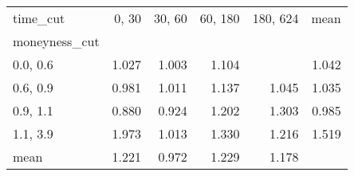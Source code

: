 \begin{tabular}{lrrrrr}
\toprule
time\_cut &  0, 30 &  30, 60 &  60, 180 &  180, 624 &  mean \\
moneyness\_cut &          &           &            &             &       \\
\midrule
0.0, 0.6    &    1.027 &     1.003 &      1.104 &             & 1.042 \\
0.6, 0.9    &    0.981 &     1.011 &      1.137 &       1.045 & 1.035 \\
0.9, 1.1    &    0.880 &     0.924 &      1.202 &       1.303 & 0.985 \\
1.1, 3.9    &    1.973 &     1.013 &      1.330 &       1.216 & 1.519 \\
mean          &    1.221 &     0.972 &      1.229 &       1.178 &       \\
\bottomrule
\end{tabular}
